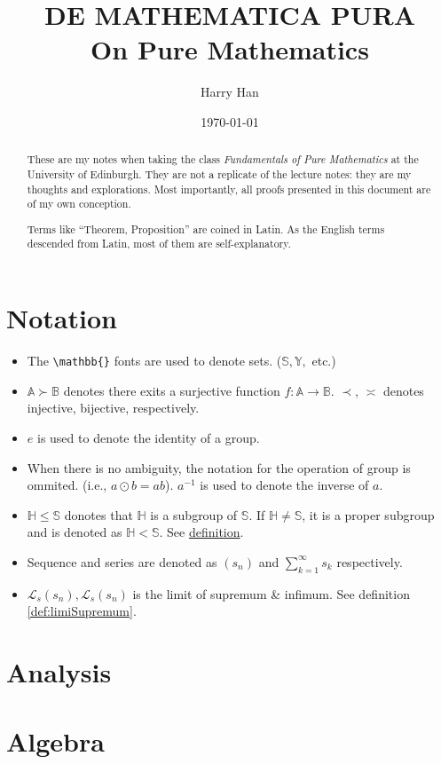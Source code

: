 \documentclass[12pt, a4paper]{report}
\title{
	DE MATHEMATICA PURA \\
	\large On Pure Mathematics
}
\author{Harry Han}
\date{\today}
\theoremstyle{definition}
\theoremstyle{definition}
\theoremstyle{remark}
\begin{document}
\maketitle
\tableofcontents

\newpage

\begin{abstract}
	These are my notes when taking the class \emph{Fundamentals of Pure Mathematics} at the University of Edinburgh. They are not a replicate of the lecture notes: they are my thoughts and explorations. 
	Most importantly, all proofs presented in this document are of my own conception. 

	Terms like ``Theorem, Proposition'' are coined in Latin. As the English terms descended from Latin, most of them are self-explanatory. 
\end{abstract}
\chapter{Notation}
\begin{itemize}
	\item The \verb|\mathbb{}| fonts are used to denote sets. ($\mathbb{S}, \mathbb{Y},$ etc.)
	\item $\mathbb{A} \succ \mathbb{B}$ denotes there exits a surjective function $f:\mathbb{A}\rightarrow \mathbb{B}$. $\prec$, $\asymp$ denotes injective, bijective, respectively.
	\item $e$ is used to denote the identity of a group.
	\item When there is no ambiguity, the notation for the operation of group is ommited. (i.e., $a \odot b = ab$).
		$a^{-1}$ is used to denote the inverse of $a$.
	\item $\mathbb{H}\leq \mathbb{S}$ donotes that $\mathbb{H}$ is a subgroup of $\mathbb{S}$. If $\mathbb{H}\neq \mathbb{S}$, it is a proper subgroup and is denoted as $\mathbb{H}<\mathbb{S}$. See \hyperlink{def:subgroup}{definition}.
	\item Sequence and series are denoted as $(s_n)$ and $\sum^{\infty}_{k=1}s_k$ respectively.
	\item $\mathcal{L}_s(s_n), \mathcal{L}_s(s_n)$ is the limit of supremum \& infimum. See definition \ref{def:limiSupremum}.

\end{itemize}

\chapter{Analysis}




\chapter{Algebra}



\appendix


\printbibliography
\end{document}
